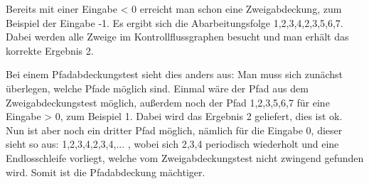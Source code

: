 Bereits mit einer Eingabe < 0 erreicht man schon eine Zweigabdeckung, zum Beispiel der Eingabe -1. Es ergibt sich die Abarbeitungsfolge 1,2,3,4,2,3,5,6,7.
Dabei werden alle Zweige im Kontrollflussgraphen besucht und man erhält das korrekte Ergebnis 2.\par
Bei einem Pfadabdeckungstest sieht dies anders aus: Man muss sich zunächst überlegen, welche Pfade möglich sind. Einmal wäre der Pfad aus dem Zweigabdeckungstest
möglich, außerdem noch der Pfad 1,2,3,5,6,7 für eine Eingabe > 0, zum Beispiel 1. Dabei wird das Ergebnis 2 geliefert, dies ist ok. \\
Nun ist aber noch ein dritter Pfad möglich, nämlich für die Eingabe 0, dieser sieht so aus: 1,2,3,4,2,3,4,... , wobei sich 2,3,4 periodisch wiederholt und eine
Endlosschleife vorliegt, welche vom Zweigabdeckungstest nicht zwingend gefunden wird. Somit ist die Pfadabdeckung mächtiger.